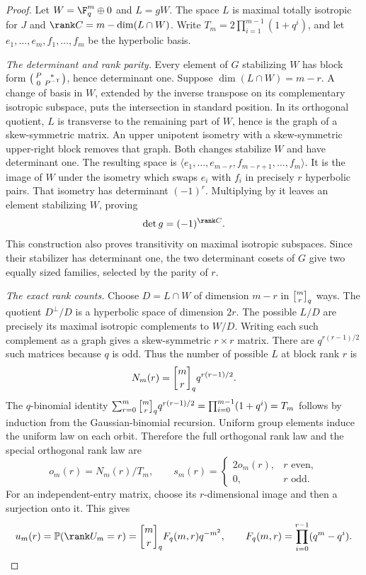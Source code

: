 \begin{proof}
Let $W=\F_q^m\oplus0$ and $L=gW$. The space $L$ is maximal totally isotropic
for $J$ and $\rank C=m-\dim(L\cap W)$. Write
$T_m=2\prod_{i=1}^{m-1}(1+q^i)$, and let $e_1,\dots,e_m,f_1,\dots,f_m$ be the
hyperbolic basis.

\emph{The determinant and rank parity.} Every element of $G$ stabilizing $W$
has block form
$\left(\begin{smallmatrix}P&*\\0&P^{-\mathsf{T}}\end{smallmatrix}\right)$, hence
determinant one. Suppose $\dim(L\cap W)=m-r$. A change of basis in $W$,
extended by the inverse transpose on its complementary isotropic subspace,
puts the intersection in standard position. In its orthogonal quotient, $L$
is transverse to the remaining part of $W$, hence is the graph of a
skew-symmetric matrix. An upper unipotent isometry with a skew-symmetric
upper-right block removes that graph. Both changes stabilize $W$ and have
determinant one. The resulting space is
$\langle e_1,\dots,e_{m-r},f_{m-r+1},\dots,f_m\rangle$. It is the image of
$W$ under the isometry which swaps $e_i$ with $f_i$ in precisely $r$
hyperbolic pairs. That isometry has determinant $(-1)^r$. Multiplying by it
leaves an element stabilizing $W$, proving
\begin{equation}\label{spn:eq:orthogonal-parity}
 \det g=(-1)^{\rank C}.
\end{equation}
This construction also proves transitivity on maximal isotropic subspaces.
Since their stabilizer has determinant one, the two determinant cosets of $G$
give two equally sized families, selected by the parity of $r$.

\emph{The exact rank counts.} Choose $D=L\cap W$ of dimension $m-r$ in
$\spnqbin{m}{r}{q}$ ways. The quotient $D^\perp/D$ is a hyperbolic space of
dimension $2r$. The possible $L/D$ are precisely its maximal isotropic
complements to $W/D$. Writing each such complement as a graph gives a
skew-symmetric $r\times r$ matrix. There are $q^{r(r-1)/2}$ such matrices
because $q$ is odd. Thus the number of possible $L$ at block rank $r$ is
\begin{equation}\label{spn:eq:orthogonal-subspace-count}
 N_m(r)=\spnqbin{m}{r}{q}q^{r(r-1)/2}.
\end{equation}
The $q$-binomial identity
$\sum_{r=0}^{m}\spnqbin{m}{r}{q}q^{r(r-1)/2}=\prod_{i=0}^{m-1}(1+q^i)=T_m$
follows by induction from the Gaussian-binomial recursion. Uniform group
elements induce the uniform law on each orbit. Therefore the full orthogonal
rank law and the special orthogonal rank law are
\[
 o_m(r)=N_m(r)/T_m,\qquad
 s_m(r)=\begin{cases}2o_m(r),&r\text{ even},\\0,&r\text{ odd}.\end{cases}
\]
For an independent-entry matrix, choose its $r$-dimensional image and then a
surjection onto it. This gives
\[
 u_m(r)=\spnP(\rank U_m=r)=\spnqbin{m}{r}{q}F_q(m,r)q^{-m^2},\qquad
 F_q(m,r)=\prod_{i=0}^{r-1}(q^m-q^i).
\]


\end{proof}

